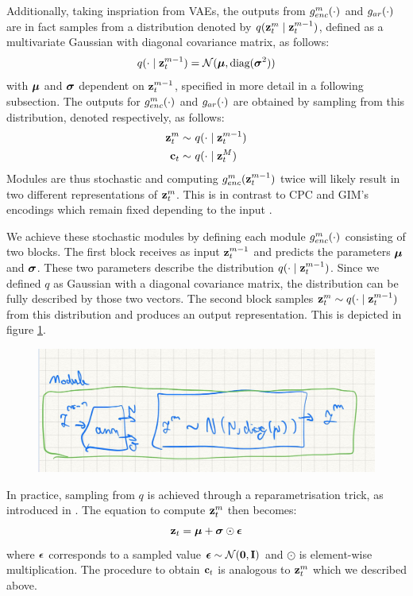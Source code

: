 			Additionally, taking inspriation from VAEs, the outputs from $g_{enc}^m(\cdot)$ and $g_{ar}(\cdot)$ are in fact samples from a distribution denoted by $q(\mathbf{z}_t^m \mid \mathbf{z}_t^{m-1})$, defined as a multivariate Gaussian with diagonal covariance matrix, as follows:
			$$q(\cdot \mid \mathbf{z}_t^{m-1}) = \mathcal{N}(\bm{\mu}, \text{diag}(\bm{\sigma}^2))$$
			with $\bm{\mu}$ and $\bm{\sigma}$ dependent on $\mathbf{z}_t^{m-1}$, specified in more detail in a following subsection.
			The outputs for $g_{enc}^m(\cdot)$ and $g_{ar}(\cdot)$ are obtained by sampling from this distribution, denoted respectively, as follows:
 			\begin{align} %
			 	\sample{\zt^m}~ & \qfromzmneg  \label{eq:sample_z_from_q} \\
			 	\sample{\ct}~ & \qfromzM
			 \end{align}
			Modules are thus stochastic and computing $g_{enc}^m(\mathbf{z}_t^{m-1})$ twice will likely result in two different representations of $\mathbf{z}_t^m$. This is in contrast to CPC and GIM's encodings which remain fixed depending to the input \cite{oordRepresentationLearningContrastive2019, lowePuttingEndEndtoEnd2020}.
		
			We achieve these stochastic modules by defining each module $g_{enc}^m(\cdot)$ consisting of two blocks. The first block receives as input $\mathbf{z}_t^{m-1}$ and predicts the parameters $\bm{\mu}$ and $\bm{\sigma}$. These two parameters describe the distribution $q(\cdot \mid \mathbf{z}_t^{m-1})$. Since we defined $q$ as Gaussian with a diagonal covariance matrix, the distribution can be fully described by those two vectors. The second block samples 
			$\mathbf{z}_t^m \sim q(\cdot \mid \mathbf{z}_t^{m-1})$ from this distribution and produces an output representation. This is depicted in figure \ref{fig:single_variational_module}.
			
			\begin{figure}[h] %
				\centering
				\includegraphics[width=0.7\linewidth]{temp_variational_module}
				\caption{}
				\label{fig:single_variational_module}
			\end{figure}
			
			In practice, sampling from $q$ is achieved through a reparametrisation trick, as introduced in \cite{kingmaAutoEncodingVariationalBayes2022}. The equation to compute $\mathbf{z}_t^m$ then becomes:
			\begin{equation*}
				\mathbf{z}_t = \bm{\mu} + \bm{\sigma} \odot \bm{\epsilon}
			\end{equation*}
			where $\bm{\epsilon}$ corresponds to a sampled value $\bm{\epsilon} \sim \mathcal{N}(\bm{\mathbf{0}}, \mathbf{I})$ and $\odot$ is element-wise multiplication. The procedure to obtain $\mathbf{c}_t$ is analogous to $\mathbf{z}_t^m$ which we described above.
			
